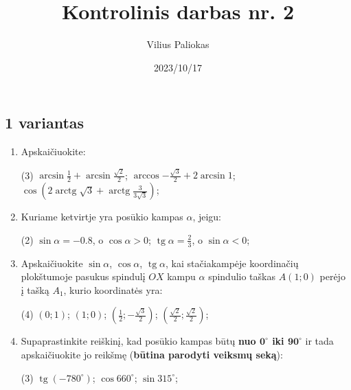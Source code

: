 \documentclass[a4paper]{article}
\title{Kontrolinis darbas nr. 2}
\author{Vilius Paliokas}
\date{2023/10/17}
\DeclareMathOperator{\tg}{tg}
\DeclareMathOperator{\arctg}{arctg}
\begin{document}
\thispagestyle{empty}
\subsection*{1 variantas}

\begin{enumerate}
      \item Apskaičiuokite:

            \begin{tasks}[item-format={\normalfont}, after-item-skip=4mm](3)
                  \task $\arcsin{\frac{1}{2}} + \arcsin{\frac{\sqrt{2}}{2}} $;
                  \task $\arccos{-\frac{\sqrt{3}}{2}} + 2\arcsin{1} $;
                  \task $\cos({2\arctg{\sqrt{3}} +
                              \arctg{\frac{3}{3\sqrt{3}}}})  $;

            \end{tasks}

      \item Kuriame ketvirtje yra posūkio kampas $\alpha$, jeigu:
            \begin{tasks}[item-format={\normalfont}, after-item-skip=4mm](2)
                  \task $\sin \alpha = -0.8$, o $\cos \alpha > 0$;
                  \task $\tg \alpha = \frac{2}{3}$, o $\sin \alpha < 0$;
            \end{tasks}
      \item Apskaičiuokite $\sin \alpha$, $\cos \alpha$, $\tg \alpha$, kai
            stačiakampėje koordinačių plokštumoje pasukus spindulį $OX$ kampu
            $\alpha$ spindulio taškas $A(1; 0)$ perėjo į tašką $A_{1}$, kurio
            koordinatės
            yra:
            \begin{tasks}[item-format={\normalfont}, after-item-skip=4mm](4)
                  \task $(0; 1)$;
                  \task $(1; 0)$;
                  \task $(\frac{1}{2}; -\frac{\sqrt{3}}{2})$;
                  \task $(\frac{\sqrt{2}}{2}; \frac{\sqrt{2}}{2})$;
            \end{tasks}

      \item Supaprastinkite reiškinį, kad posūkio kampas būtų \textbf{nuo
                  $\boldsymbol{0^\circ}$
                  iki $\boldsymbol{90^\circ}$} ir tada apskaičiuokite jo
            reikšmę
            (\textbf{būtina parodyti veiksmų seką}):
            \begin{tasks}[item-format={\normalfont},
                        after-item-skip=4mm](3)
                  \task $\tg (-780^\circ)$;
                  \task $\cos 660^\circ$;
                  \task $\sin 315^\circ$;
            \end{tasks}


\end{enumerate}
\end{document}
